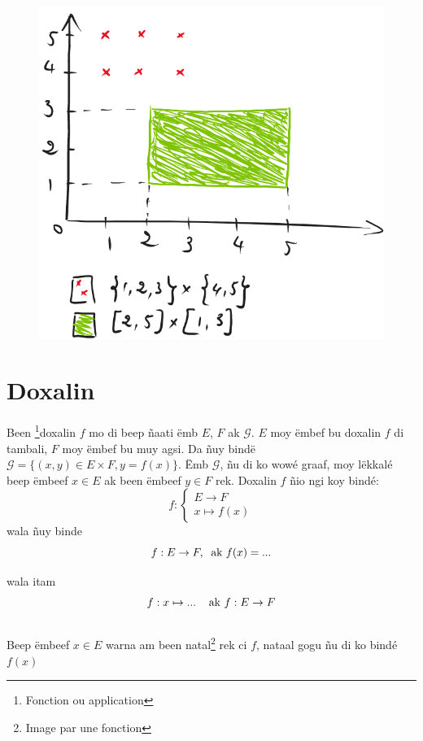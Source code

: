 \documentclass[twoside, a4paper]{article}
\begin{document}
\begin{figure}[ht]
    \centering
    \includegraphics[scale = 0.5]{image/full_carteseng.png}
    \label{fig:full_carteseng}
\end{figure}


\section{Doxalin}
\begin{tcolorbox}[enhanced jigsaw,breakable,pad at break*=1mm, colback=red!5!white,colframe=white!75!black,title= Téeki,
  watermark color=white]
 Been \footnote{Fonction ou application}doxalin $f$ mo di beep ñaati ëmb $E$, $F$ ak $\mathcal{G}$. $E$ moy ëmbef bu doxalin $f$ di tambali, $F$ moy ëmbef bu muy agsi.
Da ñuy bindë $\mathcal{G} = \big\{ (x,y) \in E\times F, y = f(x)\big\}$.
Ëmb $\mathcal{G}$, ñu di ko wowé graaf, moy lëkkalé beep ëmbeef $x\in E$ ak been ëmbeef $y\in F$ rek. Doxalin $f$ ñio ngi koy bindé: $$f: \left\{
    \begin{array}{ll}
        E \rightarrow{} F \\
        x \mapsto f(x)
    \end{array}
\right.$$ 
wala ñuy binde $$f: E \rightarrow F, \hspace{0.2cm}\text{ak } f(x) = ...$$ 

wala itam $$f: x\mapsto ... \hspace{0.2cm} \hspace{0.2cm} \text{ak } f: E \rightarrow F$$\\
Beep ëmbeef $x\in E$ warna am been natal\footnote{Image par une fonction} rek ci $f$, nataal gogu  ñu di ko bindé $f(x)$
\end{tcolorbox}
\end{document}

